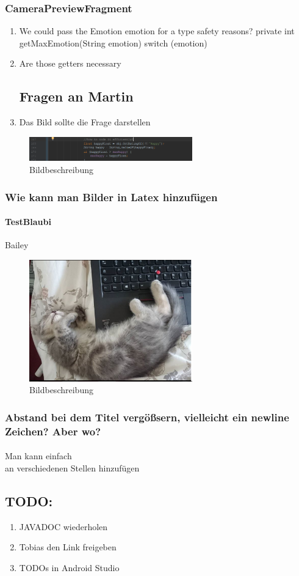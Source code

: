 \subsubsection{CameraPreviewFragment}
\begin{enumerate}
\item
We could pass the Emotion emotion for a type safety reasons? private int getMaxEmotion(String emotion) switch (emotion)
\item
Are those getters necessary
\subsection{Fragen an Martin}
\item
Das Bild sollte die Frage darstellen
\end{enumerate}
\begin{figure}
\centering\includegraphics[width=200pt]{res/setMaxHappy.PNG}
\caption{Bildbeschreibung}
\end{figure}

\subsubsection{Wie kann man Bilder in Latex hinzufügen}
\paragraph{TestBlaubi}
Bailey

\begin{figure}
\centering\includegraphics[width=200pt]{res/blaubi.PNG}
\caption{Bildbeschreibung}
\end{figure}


\subsubsection{Abstand bei dem Titel vergößsern, vielleicht ein newline Zeichen? Aber wo?}
\paragraph{}Man kann einfach \\ an verschiedenen Stellen hinzufügen

\subsection{TODO:}
\begin{enumerate}
    \item JAVADOC wiederholen
    \item Tobias den Link freigeben
    \item TODOs in Android Studio
\end{enumerate}